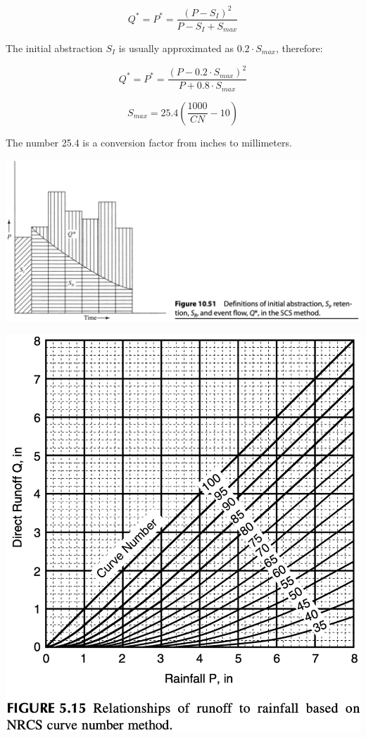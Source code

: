 \documentclass[
  letterpaper,
  DIV=11,
  numbers=noendperiod]{scrreprt}
\begin{document}
\[
Q^* = P^* = \frac{\left( P-S_{I} \right)^2}{P-S_I+S_{max}}
\]

The initial abstraction \(S_I\) is usually approximated as
\(0.2\cdot S_{max}\), therefore:

\[
Q^* = P^* = \frac{\left( P-0.2\cdot S_{max} \right)^2}{P+0.8\cdot S_{max}}
\]

\[
S_{max} = 25.4\left(\frac{1000}{CN}-10\right)
\]

The number 25.4 is a conversion factor from inches to millimeters.

\includegraphics{archive/figures/dingman-figure10.51.png}

\includegraphics{archive/figures/ward-figure5.15.png}
\end{document}
